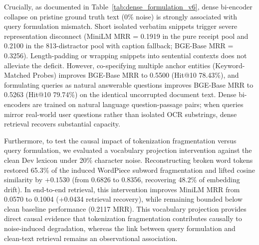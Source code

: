 Crucially, as documented in Table~\ref{tab:dense_formulation_v6}, dense bi-encoder collapse on pristine ground truth text ($0\%$ noise) is strongly associated with query formulation mismatch. Short isolated verbatim snippets trigger severe representation disconnect (MiniLM MRR = 0.1919 in the pure receipt pool and 0.2100 in the 813-distractor pool with caption fallback; BGE-Base MRR = 0.3256). Length-padding or wrapping snippets into sentential contexts does not alleviate the deficit. However, co-specifying multiple anchor entities (Keyword-Matched Probes) improves BGE-Base MRR to 0.5500 (Hit@10 78.43\%), and formulating queries as natural answerable questions improves BGE-Base MRR to 0.5263 (Hit@10 79.74\%) on the identical uncorrupted document text. Dense bi-encoders are trained on natural language question-passage pairs; when queries mirror real-world user questions rather than isolated OCR substrings, dense retrieval recovers substantial capacity.

Furthermore, to test the causal impact of tokenization fragmentation versus query formulation, we evaluated a vocabulary projection intervention against the clean Dev lexicon under 20\% character noise. Reconstructing broken word tokens restored 65.3\% of the induced WordPiece subword fragmentation and lifted cosine similarity by $+0.1530$ (from 0.6826 to 0.8356, recovering 48.2\% of embedding drift). In end-to-end retrieval, this intervention improves MiniLM MRR from 0.0570 to 0.1004 (+0.0434 retrieval recovery), while remaining bounded below clean baseline performance (0.2117 MRR). This vocabulary projection provides direct causal evidence that tokenization fragmentation contributes causally to noise-induced degradation, whereas the link between query formulation and clean-text retrieval remains an observational association.

